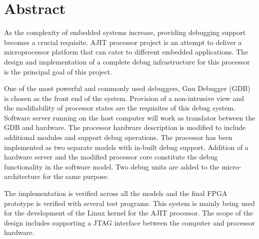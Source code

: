 
\chapter*{Abstract}
As the complexity of embedded systems increase, providing debugging support becomes a crucial requisite. AJIT processor project is an attempt to deliver a microprocessor platform that can cater to different embedded applications. The design and implementation of a complete debug infrastructure for this processor is the principal goal of this project.

One of the most powerful and commonly used debuggers, Gnu Debugger (GDB) is chosen as the front end of the system. Provision of a non-intrusive view and the modifiability of processor states are the requisites of this debug system. Software server running on the host computer will work as translator between the GDB and hardware. The processor hardware description is modified to include additional modules and support debug operations. The processor has been implemented as two separate models with in-built debug support. Addition of a hardware server and the modified processor core constitute the debug functionality in the software model. Two debug units are added to the micro-architecture for the same purpose.

The implementation is verified across all the models and the final FPGA prototype is verified with several test programs. This system is mainly being used for the development of the Linux kernel for the AJIT processor. The scope of the design includes supporting a JTAG interface between the computer and processor hardware.
\thispagestyle{titlepages}
